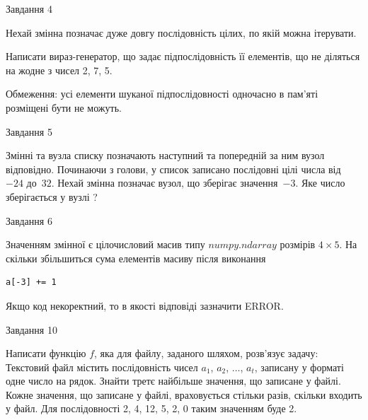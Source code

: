 \documentclass[12pt, ukrainian]{article}
\begin{document}
{               
{\begin{center}Завдання {4}\end{center}}
\vspace{-6mm}
Нехай змінна  позначає дуже довгу послідовність цілих, по якій можна ітерувати.

Написати вираз-генератор, що задає підпослідовність її елементів, що не діляться на жодне з чисел 2, 7, 5.

Обмеження: усі елементи шуканої підпослідовності одночасно в пам'яті розміщені бути не можуть.\par

\vspace{10mm}
               
{\begin{center}Завдання {5}\end{center}}
\vspace{-6mm}
Змінні  та  вузла списку позначають наступний та попередній за ним вузол відповідно. Починаючи з голови, у список записано послідовні цілі числа від~$-24$ до~$32$. Нехай змінна  позначає вузол, що зберігає значення~$-3$.
Яке число зберігається у вузлі  ?\par

               
{\begin{center}Завдання {6}\end{center}}
\vspace{-6mm}
Значенням змінної  є цілочисловий масив типу $numpy.ndarray$ розмірів $4{\times}5$. На скільки збільшиться сума елементів масиву  після виконання
\begin{verbatim}
a[-3] += 1
\end{verbatim}


Якщо код некоректний, то в якості відповіді зазначити ERROR.\par

               
{\begin{center}Завдання {10}\end{center}}
\vspace{-6mm}

Написати функцію $f$, яка для файлу, заданого шляхом, розв’язує задачу:\\ Текстовий файл містить послідовність чисел $a_1$, $a_2$, $\ldots$, $a_t$, записану у форматі одне число на рядок. Знайти третє найбільше значення, що записане у файлі. Кожне значення, що записане у файлі, враховується стільки разів, скільки входить у файл. Для послідовності 2, 4, 12, 5, 2, 0 таким значенням буде 2.

}
\end{document}
